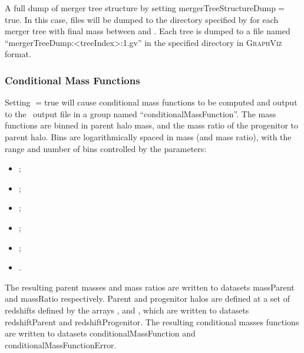 A full dump of merger tree structure by setting {\normalfont \ttfamily mergerTreeStructureDump}$=${\normalfont \ttfamily true}. In this case, files will be dumped to the directory specified by {\normalfont \ttfamily [mergerTreeStructureDumpDirectory]} for each merger tree with final mass between {\normalfont \ttfamily [mergerTreeStructureDumpMassMinimum]} and {\normalfont \ttfamily [mergerTreeStructureDumpMassMaximum]}. Each tree is dumped to a file named ``{\normalfont \ttfamily mergerTreeDump:\textless treeIndex\textgreater:1.gv}'' in the specified directory in {\normalfont \scshape GraphViz} format.

\subsubsection{Conditional Mass Functions}

Setting {\normalfont \ttfamily [mergerTreeComputeConditionalMassFunction]}$=${\normalfont \ttfamily true} will cause conditional mass functions to be computed and output to the \glc\ output file in a group named ``{\normalfont \ttfamily conditionalMassFunction}''. The mass functions are binned in parent halo mass, and the mass ratio of the progenitor to parent halo. Bins are logarithmically spaced in mass (and mass ratio), with the range and number of bins controlled by the parameters:
\begin{itemize}
\item {\normalfont \ttfamily [mergerTreeComputeConditionalMassFunctionParentMassCount]};
\item {\normalfont \ttfamily [mergerTreeComputeConditionalMassFunctionParentMassMinimum]};
\item {\normalfont \ttfamily [mergerTreeComputeConditionalMassFunctionParentMassMaximum]};
\item {\normalfont \ttfamily [mergerTreeComputeConditionalMassFunctionMassRatioCount]};
\item {\normalfont \ttfamily [mergerTreeComputeConditionalMassFunctionMassRatioMinimum]};
\item {\normalfont \ttfamily [mergerTreeComputeConditionalMassFunctionMassRatioMaximum]}.
\end{itemize}
The resulting parent masses and mass ratios are written to datasets {\normalfont \ttfamily massParent} and {\normalfont \ttfamily massRatio} respectively. Parent and progenitor halos are defined at a set of redshifts defined by the arrays {\normalfont \ttfamily [mergerTreeComputeConditionalMassFunctionParentRedshifts]}, and {\normalfont \ttfamily [mergerTreeComputeConditionalMassFunctionProgenitorRedshifts]}, which are written to datasets {\normalfont \ttfamily redshiftParent} and {\normalfont \ttfamily redshiftProgenitor}. The resulting conditional masses functions are written to datasets {\normalfont \ttfamily conditionalMassFunction} and {\normalfont \ttfamily conditionalMassFunctionError}.

